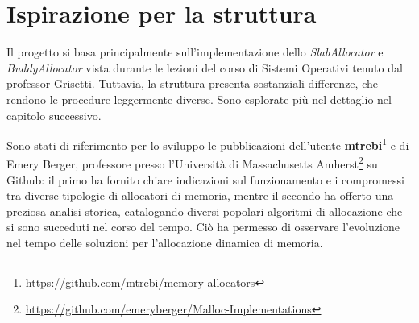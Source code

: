 \section{Ispirazione per la struttura}
Il progetto si basa principalmente sull’implementazione dello \textit{SlabAllocator} e \textit{BuddyAllocator} vista durante le lezioni del corso di Sistemi Operativi tenuto dal professor Grisetti. Tuttavia, la struttura presenta sostanziali differenze, che rendono le procedure leggermente diverse. Sono esplorate più nel dettaglio nel capitolo successivo.

Sono stati di riferimento per lo sviluppo le pubblicazioni dell’utente \textbf{mtrebi}\footnote{\url{https://github.com/mtrebi/memory-allocators}} e di Emery Berger, professore presso l’Università di Massachusetts Amherst\footnote{\url{https://github.com/emeryberger/Malloc-Implementations}} su Github: il primo ha fornito chiare indicazioni sul funzionamento e i compromessi tra diverse tipologie di allocatori di memoria, mentre il secondo ha offerto una preziosa analisi storica, catalogando diversi popolari algoritmi di allocazione che si sono succeduti nel corso del tempo. Ciò ha permesso di osservare l’evoluzione nel tempo delle soluzioni per l’allocazione dinamica di memoria.